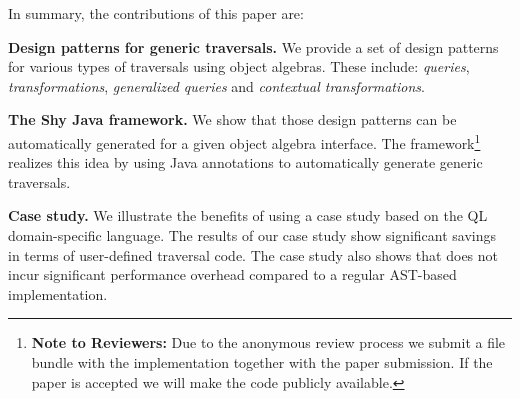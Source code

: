 In summary, the contributions of this paper are:

\begin{itemize*}

\item {\bf Design patterns for generic traversals.} We provide a set of design
patterns for various types of traversals using object algebras. These include:
\emph{queries}, \emph{transformations},
\emph{generalized queries} and \emph{contextual transformations}.

\item {\bf The Shy Java framework.} We show that those design patterns
  can be automatically generated for a given object algebra
  interface. The \name framework\footnote{{\bf
      Note to Reviewers:} Due to the anonymous review process we
    submit a file bundle with the implementation together with the paper submission. If the
    paper is accepted we will make the code publicly available.} realizes this idea by using
   Java annotations to automatically generate generic traversals.

\item {\bf Case study.} We illustrate the benefits of \name using a case study based on the QL domain-specific
  language. The results of our case study show significant savings in
  terms of user-defined traversal code. The case study also shows that \name does not incur significant performance overhead compared to a regular AST-based implementation. 
\end{itemize*}
